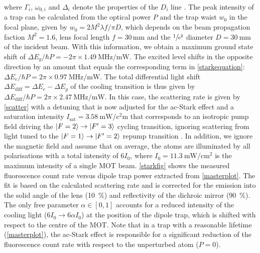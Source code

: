 \documentclass[../Thesis-IJspeert.tex]{subfiles}
\begin{document}
where $\Gamma_i$, $\omega_{0,i}$ and $\Delta_i$ denote the properties of the $D_i$ line \cite{Grimm2000}. The peak intensity of a trap can be calculated from the optical power $P$ and the trap waist $w_0$ in the focal plane, given by $w_0=2M^2 \lambda f/\pi D$, which depends on the beam propagation faction $M^2=1.6$, lens focal length $f=30\,$mm and the $\sfrac{1}{\mathrm{e}^2}$ diameter $D=\SI{30}{\milli\meter}$ of the incident beam. With this information, we obtain a maximum ground state shift of $\Delta E_g/\hbar P=-2\pi\times \SI{1.49}{\mega\hertz\per\milli\watt}$. The excited level  shifts in the opposite direction by an amount that equals the corresponding term in \autoref{starkequation}: $\Delta E_e/\hbar P=2\pi\times \SI{0.97}{\mega\hertz\per\milli\watt}$. The total differential light shift $\Delta E_\text{diff}=\Delta E_e-\Delta E_g$ of the cooling transition is thus given by $\Delta E_\text{diff}/\hbar P=2\pi\times \SI{2.47}{\mega\hertz\per\milli\watt}$. In this case, the scattering rate is given by \autoref{scatter} with a detuning that is now adjusted for the ac-Stark effect and a saturation intensity $I_\text{sat}=\SI{3.58}{\milli\watt\per\square\centi\meter}$ that corresponds to an isotropic pump field driving the $\ket{F=2}\rightarrow\ket{F'=3}$ cycling transition, ignoring scattering from light tuned to the $\ket{F=1}\rightarrow\ket{F'=2}$ repump transition \cite{steck}. In addition, we ignore the magnetic field and assume that on average, the atoms are illuminated by all polarisations with a total intensity of $6I_0$, where $I_0=\SI{11.3}{\milli\watt\per\centi\meter^2}$ is the maximum intensity of a single MOT beam. \autoref{starkfig} shows the measured fluorescence count rate versus dipole trap power extracted from \autoref{masterplot}. The fit is based on the calculated scattering rate and is corrected for the emission into the solid angle of the lens (\SI{10}{\percent}) and reflectivity of the dichroic mirror (\SI{90}{\percent}). The only free parameter $\alpha\in[0,1]$ accounts for a reduced intensity of the cooling light ($6I_0\rightarrow6\alpha I_0$) at the position of the dipole trap, which is shifted with respect to the centre of the MOT. Note that in a trap with a reasonable lifetime (\autoref{masterplot}), the ac-Stark effect is responsible for a significant reduction of the fluorescence count rate with respect to the unperturbed atom ($P=0$).
\end{document}
